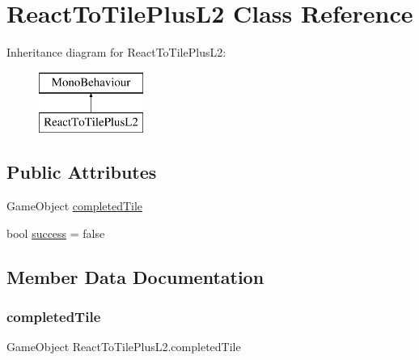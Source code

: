 \hypertarget{class_react_to_tile_plus_l2}{}\section{React\+To\+Tile\+Plus\+L2 Class Reference}
\label{class_react_to_tile_plus_l2}
Inheritance diagram for React\+To\+Tile\+Plus\+L2\+:\begin{figure}[H]
\begin{center}
\leavevmode
\includegraphics[height=2.000000cm]{class_react_to_tile_plus_l2}
\end{center}
\end{figure}
\subsection*{Public Attributes}
\begin{DoxyCompactItemize}
\item 
Game\+Object \hyperlink{class_react_to_tile_plus_l2_a424c5a84fcbafbf619ac0cefc562022c}{completed\+Tile}
\item 
bool \hyperlink{class_react_to_tile_plus_l2_a6fc0cd25ccf2e96b2fb9671368aa02f8}{success} = false
\end{DoxyCompactItemize}


\subsection{Member Data Documentation}
\mbox{\label{class_react_to_tile_plus_l2_a424c5a84fcbafbf619ac0cefc562022c}} 
\subsubsection{\texorpdfstring{completed\+Tile}{completedTile}}
{\footnotesize\ttfamily Game\+Object React\+To\+Tile\+Plus\+L2.\+completed\+Tile}

\mbox{\label{class_react_to_tile_plus_l2_a6fc0cd25ccf2e96b2fb9671368aa02f8}} 
